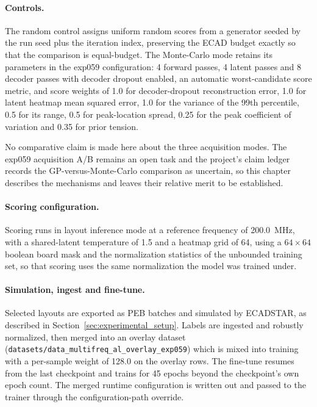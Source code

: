 \paragraph{Controls.} The random control assigns uniform random scores from a generator seeded by the
run seed plus the iteration index, preserving the ECAD budget exactly so that the comparison is
equal-budget. The Monte-Carlo mode retains its parameters in the exp059 configuration: 4 forward
passes, 4 latent passes and 8 decoder passes with decoder dropout enabled, an automatic
worst-candidate score metric, and score weights of 1.0 for decoder-dropout reconstruction error, 1.0
for latent heatmap mean squared error, 1.0 for the variance of the 99th percentile, 0.5 for its
range, 0.5 for peak-location spread, 0.25 for the peak coefficient of variation and 0.35 for prior
tension.

No comparative claim is made here about the three acquisition modes. The exp059 acquisition A/B
remains an open task and the project's claim ledger records the GP-versus-Monte-Carlo comparison as
uncertain, so this chapter describes the mechanisms and leaves their relative merit to be
established.

\paragraph{Scoring configuration.} Scoring runs in layout inference mode at a reference frequency of
200.0~MHz, with a shared-latent temperature of 1.5 and a heatmap grid of 64, using a $64 \times 64$
boolean board mask and the normalization statistics of the unbounded training set, so that scoring
uses the same normalization the model was trained under.

\paragraph{Simulation, ingest and fine-tune.} Selected layouts are exported as PEB batches and
simulated by ECADSTAR, as described in Section~\ref{sec:experimental_setup}. Labels are ingested and
robustly normalized, then merged into an overlay dataset
(\texttt{datasets/data\_multifreq\_al\_overlay\_exp059}) which is mixed into training with a
per-sample weight of 128.0 on the overlay rows.
The fine-tune resumes from the last checkpoint and trains for 45 epochs beyond the checkpoint's own
epoch count. The merged runtime configuration is written out and passed to the trainer through the
configuration-path override.

